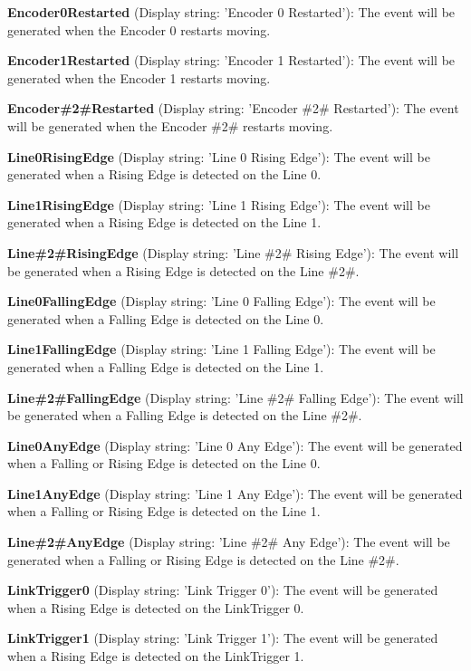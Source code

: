 \begin{DoxyItemize}
\item {\bfseries Encoder0\+Restarted} (Display string\+: 'Encoder 0 Restarted')\+: The event will be generated when the Encoder 0 restarts moving.
\item {\bfseries Encoder1\+Restarted} (Display string\+: 'Encoder 1 Restarted')\+: The event will be generated when the Encoder 1 restarts moving.
\item {\bfseries Encoder\#2\#Restarted} (Display string\+: 'Encoder \#2\# Restarted')\+: The event will be generated when the Encoder \#2\# restarts moving.
\item {\bfseries Line0\+Rising\+Edge} (Display string\+: 'Line 0 Rising Edge')\+: The event will be generated when a Rising Edge is detected on the Line 0.
\item {\bfseries Line1\+Rising\+Edge} (Display string\+: 'Line 1 Rising Edge')\+: The event will be generated when a Rising Edge is detected on the Line 1.
\item {\bfseries Line\#2\#Rising\+Edge} (Display string\+: 'Line \#2\# Rising Edge')\+: The event will be generated when a Rising Edge is detected on the Line \#2\#.
\item {\bfseries Line0\+Falling\+Edge} (Display string\+: 'Line 0 Falling Edge')\+: The event will be generated when a Falling Edge is detected on the Line 0.
\item {\bfseries Line1\+Falling\+Edge} (Display string\+: 'Line 1 Falling Edge')\+: The event will be generated when a Falling Edge is detected on the Line 1.
\item {\bfseries Line\#2\#Falling\+Edge} (Display string\+: 'Line \#2\# Falling Edge')\+: The event will be generated when a Falling Edge is detected on the Line \#2\#.
\item {\bfseries Line0\+Any\+Edge} (Display string\+: 'Line 0 Any Edge')\+: The event will be generated when a Falling or Rising Edge is detected on the Line 0.
\item {\bfseries Line1\+Any\+Edge} (Display string\+: 'Line 1 Any Edge')\+: The event will be generated when a Falling or Rising Edge is detected on the Line 1.
\item {\bfseries Line\#2\#Any\+Edge} (Display string\+: 'Line \#2\# Any Edge')\+: The event will be generated when a Falling or Rising Edge is detected on the Line \#2\#.
\item {\bfseries Link\+Trigger0} (Display string\+: 'Link Trigger 0')\+: The event will be generated when a Rising Edge is detected on the Link\+Trigger 0.
\item {\bfseries Link\+Trigger1} (Display string\+: 'Link Trigger 1')\+: The event will be generated when a Rising Edge is detected on the Link\+Trigger 1.

\end{DoxyItemize}
